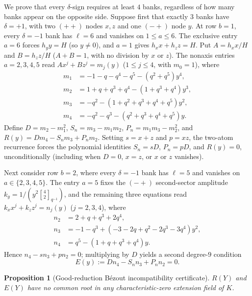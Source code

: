 \documentclass[11pt,reqno]{amsart}
\numberwithin{equation}{section}
\newtheorem{proposition}[theorem]{Proposition}
\theoremstyle{definition}
\theoremstyle{remark}
\newcommand{\gb}[3]{\genfrac{[}{]}{0pt}{}{#1}{#2}_{#3}}
\begin{document}
We prove that every $\delta$-sign requires at least $4$ banks, regardless of how many banks appear on the opposite side. Suppose first that exactly $3$ banks have $\delta=+1$, with two $(++)$ nodes $x,z$ and one $(-+)$ node $y$. At row $b=1$, every $\delta=-1$ bank has $\ell=6$ and vanishes on $1\le a\le 6$. The exclusive entry $a=6$ forces $h_y y=H$ (so $y\ne 0$), and $a=1$ gives $h_x x + h_z z = H$. Put $A=h_x x/H$ and $B=h_z z/H$ ($A+B=1$, with no division by $x$ or $z$). The nonaxis entries $a=2,3,4,5$ read $Ax^j + Bz^j = m_j(y)$ ($1\le j\le 4$, with $m_0=1$), where
\begin{align*}
m_1 &= -1-q-q^4-q^5 - (q^2+q^5)y^4,\\
m_2 &= 1+q+q^3+q^4 - (1+q^3+q^4)y^3,\\
m_3 &= -q^2 - (1+q^2+q^3+q^4+q^5)y^2,\\
m_4 &= -q^2-q^3 - (q^2+q^3+q^4+q^5)y.
\end{align*}
Define $D=m_2-m_1^2$, $S_n=m_3-m_1m_2$, $P_n=m_1m_3-m_2^2$, and $R(y)=Dm_4-S_nm_3+P_nm_2$. Setting $s=x+z$ and $p=xz$, the two-atom recurrence forces the polynomial identities $S_n=sD$, $P_n=pD$, and $R(y)=0$, unconditionally (including when $D=0$, $x=z$, or $x$ or $z$ vanishes).

Next consider row $b=2$, where every $\delta=-1$ bank has $\ell=5$ and vanishes on $a\in\{2,3,4,5\}$. The entry $a=5$ fixes the $(-+)$ second-sector amplitude $k_y = 1/(y^2\gb{4}{2}{q^{-1}})$, and the remaining three equations read $k_x x^j + k_z z^j = n_j(y)$ ($j=2,3,4$), where
\begin{align*}
n_2 &= 2+q+q^3+2q^4,\\
n_3 &= -1-q^3 + (-3-2q+q^2-2q^3-3q^4)y^2,\\
n_4 &= q^5 - (1+q+q^3+q^4)y.
\end{align*}
Hence $n_4 - sn_3 + pn_2 = 0$; multiplying by $D$ yields a second degree-$9$ condition
\[
E(y) := Dn_4 - S_n n_3 + P_n n_2 = 0.
\]

\begin{proposition}[Good-reduction B\'ezout incompatibility certificate]
\label{prop:n7-bezout}
$R(Y)$ and $E(Y)$ have no common root in any characteristic-zero extension field of $K$.
\end{proposition}
\end{document}
